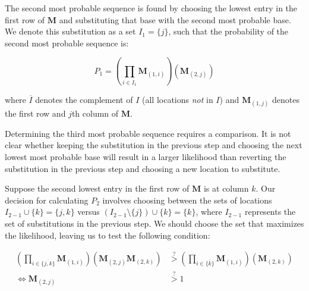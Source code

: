 \documentclass[
]{article}
\begin{document}
The second most probable sequence is found by choosing the lowest entry
in the first row of \(\mathbf M\) and substituting that base with the
second most probable base. We denote this substitution as a set
\(I_1=\{j\}\), such that the probability of the second most probable
sequence is:

\[
P_1 = \left(\prod_{i\in \overline I_1}\mathbf M_{(1, i)}\right)\left(\mathbf M_{(2, j)}\right)
\]

\noindent where \(\overline I\) denotes the complement of \(I\) (all
locations \emph{not} in \(I\)) and \(\mathbf M_{(1, j)}\) denotes the
first row and \(j\)th column of \(\mathbf M\).

Determining the third most probable sequence requires a comparison. It
is not clear whether keeping the substitution in the previous step and
choosing the next lowest most probable base will result in a larger
likelihood than reverting the substitution in the previous step and
choosing a new location to substitute.

Suppose the second lowest entry in the first row of \(\mathbf M\) is at
column \(k\). Our decision for calculating \(P_2\) involves choosing
between the sets of locations \(I_{2-1}\cup \{k\} = \{j, k\}\) versus
\(\left(I_{2-1}\setminus\{j\}\right)\cup\{k\} = \{k\}\), where
\(I_{2-1}\) represents the set of substitutions in the previous step. We
should choose the set that maximizes the likelihood, leaving us to test
the following condition:

\begin{align}
\left(\prod_{i\in \overline {\{j,k\}}}\mathbf M_{(1, i)}\right)\left(\mathbf M_{(2, j)}\mathbf M_{(2, k)}\right) &\stackrel{?}{>} \left(\prod_{i\in \overline {\{k\}}}\mathbf M_{(1, i)}\right)\left(\mathbf M_{(2, k)}\right) \\
\Leftrightarrow \mathbf M_{(2, j)} &\stackrel{?}{>} 1
\end{align}

  
\end{document}
